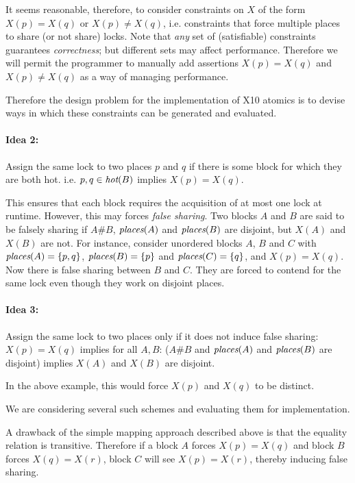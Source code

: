 \documentclass[twocolumn]{article}
\def\Xten{{\sf X10}}
\def\places{\mbox{\em places}}
\def\hot{\mbox{\em hot}}
\begin{document}
It seems reasonable, therefore, to consider constraints on $X$ of the
form $X(p)=X(q)$ or $X(p)\not=X(q)$, i.e.{} constraints that force
multiple places to share (or not share) locks. Note that {\em any} set of
(satisfiable) constraints guarantees {\em correctness}; but different
sets may affect performance. Therefore we will permit the programmer
to manually add assertions $X(p)=X(q)$ and $X(p)\not=X(q)$ as a way of
managing performance.

Therefore the design problem for the implementation of \Xten{} atomics is
to devise ways in which these constraints can be generated and
evaluated.

{}\paragraph{Idea 2:} Assign the same lock to two places $p$ and $q$ if
there is some block for which they are both hot. i.e.{} $p, q \in
\hot(B)$ implies $X(p)=X(q)$.

This ensures that each block requires the acquisition of at most one
lock at runtime. However, this may forces {\em false sharing}. Two
blocks $A$ and $B$ are said to be falsely sharing if $A \# B$,
$\places(A)$ and $\places(B)$ are disjoint, but $X(A)$ and
$X(B)$ are not.  For instance, consider unordered blocks $A$,
$B$ and $C$ with $\places(A)=\{p,q\}$, $\places(B)=\{p\}$ and
$\places(C)=\{q\}$, and $X(p)=X(q)$. Now there is false sharing
between $B$ and $C$. They are forced to contend for the same lock even
though they work on disjoint places.

\paragraph{Idea 3:} Assign the same lock to two places only if it does not 
induce false sharing:
$X(p)=X(q)$ implies    for all $A, B$: 
($A \# B$ and $\places(A)$ and $\places(B)$ are disjoint)
     implies $X(A)$ and $X(B)$ are disjoint.

In the above example, this would force $X(p)$ and $X(q)$ to be distinct.

We are considering several such schemes and evaluating them for
implementation. 

A drawback of the simple mapping approach described above is that the
equality relation is transitive. Therefore if a block $A$ forces
$X(p)=X(q)$ and block $B$ forces $X(q)=X(r)$, block $C$ will see $X(p)=X(r)$,
thereby inducing false sharing.
\end{document}
